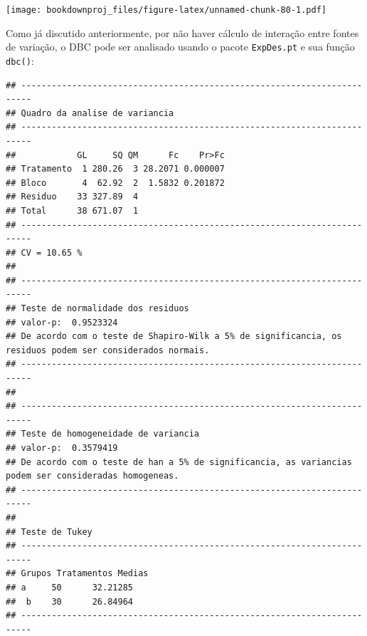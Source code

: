 \documentclass[
]{article}
\newenvironment{Shaded}{\begin{snugshade}}{\end{snugshade}}
\newcommand{\DataTypeTok}[1]{\textcolor[rgb]{0.13,0.29,0.53}{#1}}
\newcommand{\DecValTok}[1]{\textcolor[rgb]{0.00,0.00,0.81}{#1}}
\newcommand{\KeywordTok}[1]{\textcolor[rgb]{0.13,0.29,0.53}{\textbf{#1}}}
\newcommand{\NormalTok}[1]{#1}
\newcommand{\OperatorTok}[1]{\textcolor[rgb]{0.81,0.36,0.00}{\textbf{#1}}}
\newcommand{\StringTok}[1]{\textcolor[rgb]{0.31,0.60,0.02}{#1}}
\begin{document}
\begin{Shaded}
\end{Shaded}

\texttt{[image: bookdownproj\_files/figure-latex/unnamed-chunk-80-1.pdf]}

Como já discutido anteriormente, por não haver cálculo de interação entre fontes de variação, o DBC pode ser analisado usando o pacote \texttt{ExpDes.pt} e sua função \texttt{dbc()}:

\begin{Shaded}
\end{Shaded}

\begin{verbatim}
## ------------------------------------------------------------------------
## Quadro da analise de variancia
## ------------------------------------------------------------------------
##            GL     SQ QM      Fc    Pr>Fc
## Tratamento  1 280.26  3 28.2071 0.000007
## Bloco       4  62.92  2  1.5832 0.201872
## Residuo    33 327.89  4                 
## Total      38 671.07  1                 
## ------------------------------------------------------------------------
## CV = 10.65 %
## 
## ------------------------------------------------------------------------
## Teste de normalidade dos residuos 
## valor-p:  0.9523324 
## De acordo com o teste de Shapiro-Wilk a 5% de significancia, os residuos podem ser considerados normais.
## ------------------------------------------------------------------------
## 
## ------------------------------------------------------------------------
## Teste de homogeneidade de variancia 
## valor-p:  0.3579419 
## De acordo com o teste de han a 5% de significancia, as variancias podem ser consideradas homogeneas.
## ------------------------------------------------------------------------
## 
## Teste de Tukey
## ------------------------------------------------------------------------
## Grupos Tratamentos Medias
## a     50      32.21285 
##  b    30      26.84964 
## ------------------------------------------------------------------------
\end{verbatim}
\end{document}
